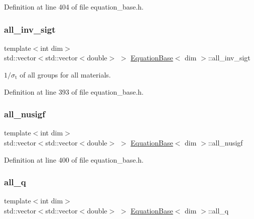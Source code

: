 Definition at line 404 of file equation\+\_\+base.\+h.

\mbox{\label{class_equation_base_aedead29f1c4bb6b9f7b17b1fe1441c5f}} 
\subsubsection{\texorpdfstring{all\+\_\+inv\+\_\+sigt}{all\_inv\_sigt}}
{\footnotesize\ttfamily template$<$int dim$>$ \\
std\+::vector$<$std\+::vector$<$double$>$ $>$ \hyperlink{class_equation_base}{Equation\+Base}$<$ dim $>$\+::all\+\_\+inv\+\_\+sigt\hspace{0.3cm}{\ttfamily [protected]}}



$1/\sigma_\mathrm{t}$ of all groups for all materials. 



Definition at line 393 of file equation\+\_\+base.\+h.

\mbox{\label{class_equation_base_a8c88d4b3e532cb639cea6e653dee5cfc}} 
\subsubsection{\texorpdfstring{all\+\_\+nusigf}{all\_nusigf}}
{\footnotesize\ttfamily template$<$int dim$>$ \\
std\+::vector$<$std\+::vector$<$double$>$ $>$ \hyperlink{class_equation_base}{Equation\+Base}$<$ dim $>$\+::all\+\_\+nusigf\hspace{0.3cm}{\ttfamily [protected]}}



Definition at line 400 of file equation\+\_\+base.\+h.

\mbox{\label{class_equation_base_add5be1036bc07500adc0d925020798a6}} 
\subsubsection{\texorpdfstring{all\+\_\+q}{all\_q}}
{\footnotesize\ttfamily template$<$int dim$>$ \\
std\+::vector$<$std\+::vector$<$double$>$ $>$ \hyperlink{class_equation_base}{Equation\+Base}$<$ dim $>$\+::all\+\_\+q\hspace{0.3cm}{\ttfamily [protected]}}



